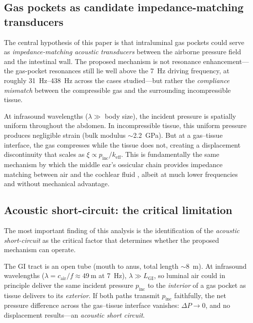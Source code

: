 \documentclass[12pt]{article}
\begin{document}
\subsection{Gas pockets as candidate impedance-matching transducers}

The central hypothesis of this paper is that intraluminal gas pockets could
serve as \emph{impedance-matching acoustic transducers} between the airborne
pressure field and the intestinal wall.  The proposed mechanism is not resonance
enhancement---the gas-pocket resonances still lie well above the
\SI{7}{\hertz} driving frequency, at roughly \SIrange{31}{438}{\hertz}
across the cases studied---but rather the \emph{compliance mismatch} between the
compressible gas and the surrounding incompressible tissue.

At infrasound wavelengths ($\lambda \gg$ body size), the incident pressure
is spatially uniform throughout the abdomen.  In incompressible tissue,
this uniform pressure produces negligible strain (bulk modulus
$\sim$\SI{2.2}{\giga\pascal}).  But at a gas--tissue interface, the gas
compresses while the tissue does not, creating a displacement discontinuity
that scales as $\xi \propto p_\text{inc}/k_\text{eff}$.  This is
fundamentally the same mechanism by which the middle ear's ossicular chain
provides impedance matching between air and the cochlear fluid
\citep{Junger1986}, albeit at much lower frequencies and without mechanical
advantage.


\subsection{Acoustic short-circuit: the critical limitation}
\label{sec:short_circuit}

The most important finding of this analysis is the identification of the
\emph{acoustic short-circuit} as the critical factor that determines
whether the proposed mechanism can operate.

The GI tract is an open tube (mouth to anus, total length
$\sim$\SI{8}{\metre}).  At infrasound wavelengths
($\lambda = c_\text{air}/f \approx \SI{49}{\metre}$ at \SI{7}{\hertz}),
$\lambda \gg L_\text{GI}$, so luminal air could in principle deliver the
same incident pressure $p_\text{inc}$ to the \emph{interior} of a gas
pocket as tissue delivers to its \emph{exterior}.  If both paths transmit
$p_\text{inc}$ faithfully, the net pressure difference across the
gas--tissue interface vanishes: $\Delta P \to 0$, and no displacement
results---an \emph{acoustic short circuit}.
\end{document}
